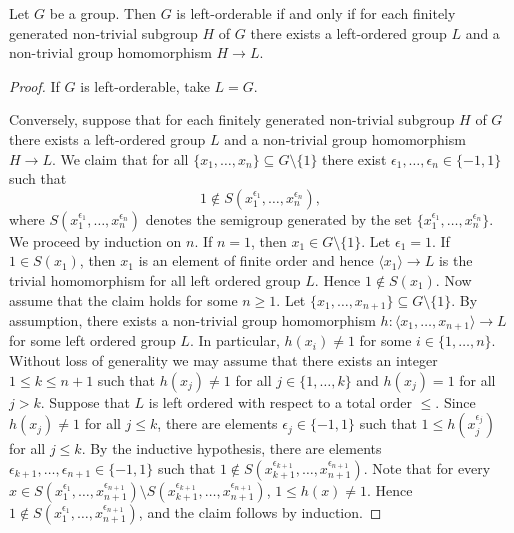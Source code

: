 
\begin{theorem}
Let $G$ be a group. Then $G$ is left-orderable if and only if 
for each finitely generated non-trivial subgroup $H$ of $G$ there exists a left-ordered group $L$ 
and a non-trivial group homomorphism $H\to L$.  
\end{theorem}

\begin{proof}
	If $G$ is left-orderable, take $L=G$. 
	
	Conversely, suppose that for each finitely generated non-trivial subgroup $H$ of $G$ there exists a left-ordered group $L$ 
and a non-trivial group homomorphism $H\to L$. We claim that for all $\{x_1,\dots,x_n\}\subseteq G\setminus\{1\}$ 
	there exist $\epsilon_1,\dots,\epsilon_n\in\{-1,1\}$ such that 
	\[
	1\not\in S(x_1^{\epsilon_1},\dots,x_n^{\epsilon_n}),
	\]
	where $S(x_1^{\epsilon_1},\dots,x_n^{\epsilon_n})$ denotes the semigroup generated by 
	the set $\{x_1^{\epsilon_1},\dots,x_n^{\epsilon_n}\}$. 
	We proceed by induction on $n$. If $n=1$, then $x_1\in G\setminus\{1\}$. Let $\epsilon_1=1$. If
	$1\in S(x_1)$, then $x_1$ is an element of finite order and hence $\langle x_1\rangle\to L$ is the trivial homomorphism for all left ordered group $L$. Hence $1\notin S(x_1)$.
    Now assume that the claim holds for some $n\geq 1$. Let $\{x_1,\dots,x_{n+1}\}\subseteq G\setminus\{1\}$. 
	By assumption, there exists a non-trivial group homomorphism 
	$h\colon\langle x_1,\dots,x_{n+1}\rangle\to L$ for some left ordered group $L$. In particular, $h(x_i)\ne 1$ for some $i\in\{1,\dots,n\}$. Without loss
	of generality we may assume that there exists an integer $1\leq k\leq n+1$ such that $h(x_j)\ne 1$ for all $j\in\{1,\dots,k\}$ and 
	$h(x_j)=1$ for all $j>k$. Suppose that $L$ is left ordered with respect to a total order $\leq$. Since $h(x_j)\ne 1$ for all $j\leq k$, there
	are elements $\epsilon_j\in\{-1,1\}$ such that $1\leq h(x_j^{\epsilon_j})$ for all $j\leq k$. By the inductive hypothesis, 
	there are elements $\epsilon_{k+1},\dots,\epsilon_{n+1}\in\{-1,1\}$ such that 
	$1\not\in S(x_{k+1}^{\epsilon_{k+1}},\dots,x_{n+1}^{\epsilon_{n+1}})$. Note that for every  $x\in S(x_1^{\epsilon_1},\dots,x_{n+1}^{\epsilon_{n+1}})\setminus S(x_{k+1}^{\epsilon_{k+1}},\dots,x_{n+1}^{\epsilon_{n+1}})$, $1\leq h(x)\neq 1$. Hence $1\notin S(x_1^{\epsilon_1},\dots ,x_{n+1}^{\epsilon_{n+1}})$, and the claim follows by induction.
	

\end{proof}
